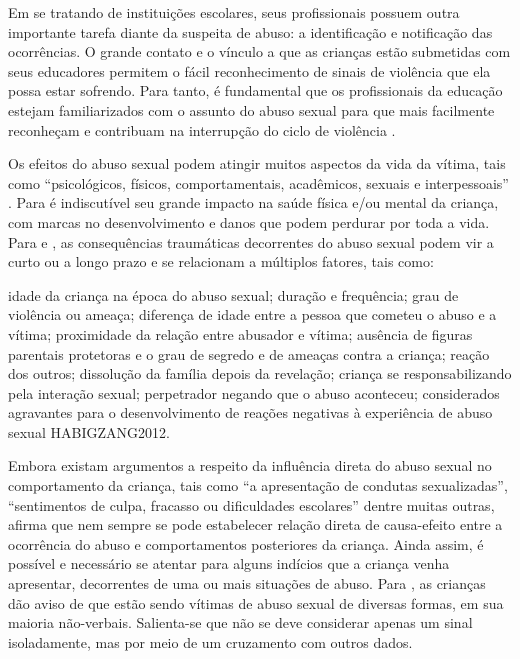 Em se tratando de instituições escolares, seus profissionais possuem outra importante tarefa diante da suspeita de abuso: a identificação e notificação das ocorrências. O grande contato e o vínculo a que as crianças estão submetidas com seus educadores permitem o fácil reconhecimento de sinais de violência que ela possa estar sofrendo. Para tanto, é fundamental que os profissionais da educação estejam familiarizados com o assunto do abuso sexual para que mais facilmente reconheçam e contribuam na interrupção do ciclo de violência \cite{CHILDHOODBRASIL2009}.

Os efeitos do abuso sexual podem atingir muitos aspectos da vida da vítima, tais como ``psicológicos, físicos, comportamentais, acadêmicos, sexuais e interpessoais'' .  Para  é indiscutível seu grande impacto na saúde física e/ou mental da criança, com marcas no desenvolvimento e danos que podem perdurar por toda a vida. Para  e , as consequências traumáticas decorrentes do abuso sexual podem vir a curto ou a longo prazo e se relacionam a múltiplos fatores, tais como:

\begin{citacao}
	idade da criança na época do abuso sexual; duração e frequência; grau de violência ou ameaça; diferença de idade entre a pessoa que cometeu o abuso e a vítima; proximidade da relação entre abusador e vítima; ausência de figuras parentais protetoras e o grau de segredo e de ameaças contra a criança; reação dos outros; dissolução da família depois da revelação; criança se responsabilizando pela interação sexual; perpetrador negando que o abuso aconteceu; considerados agravantes para o desenvolvimento de reações negativas à experiência de abuso sexual \cite[p. 70]{FURNISS1993, KAPLANSADOCKGREBB1997, SANDERSON2005}{HABIGZANG2012}.
\end{citacao}

Embora existam argumentos a respeito da influência direta do abuso sexual no comportamento da criança, tais como ``a apresentação de condutas sexualizadas'', ``sentimentos de culpa, fracasso ou dificuldades escolares'' dentre muitas outras,  afirma que nem sempre se pode estabelecer relação direta de causa-efeito entre a ocorrência do abuso e comportamentos posteriores da criança. Ainda assim, é possível e necessário se atentar para alguns indícios que a criança venha apresentar, decorrentes de uma ou mais situações de abuso. Para , as crianças dão aviso de que estão sendo vítimas de abuso sexual de diversas formas, em sua maioria não-verbais. Salienta-se que não se deve considerar apenas um sinal isoladamente, mas por meio de um cruzamento com outros dados.

